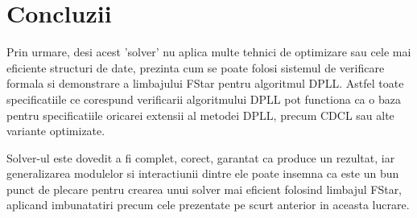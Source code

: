 \chapter*{Concluzii} 


Prin urmare, desi acest 'solver' nu aplica multe tehnici de optimizare sau cele mai eficiente structuri de date, prezinta cum se poate folosi sistemul de verificare formala si demonstrare a limbajului FStar pentru algoritmul DPLL. Astfel toate specificatiile ce corespund verificarii algoritmului DPLL pot functiona ca o baza pentru specificatiile oricarei extensii al metodei DPLL, precum CDCL sau alte variante optimizate.

Solver-ul este dovedit a fi complet, corect, garantat ca produce un rezultat, iar generalizarea modulelor si interactiunii dintre ele poate insemna ca este un bun punct de plecare pentru crearea unui solver mai eficient folosind limbajul FStar, aplicand \linebreak imbunatatiri precum cele prezentate pe scurt anterior in aceasta lucrare. 
